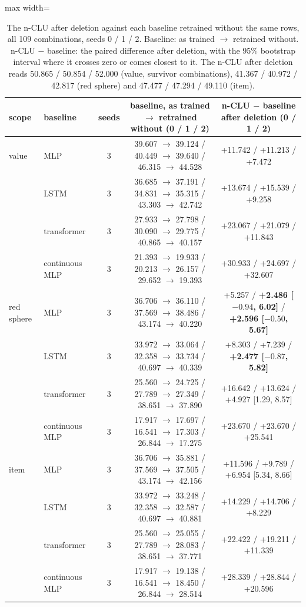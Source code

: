 \documentclass{article} %
\begin{document}
\begin{table}[h]
\centering\scriptsize
\caption{The n-CLU after deletion against each baseline retrained without the same rows, all %
109 combinations, seeds 0 / 1 / 2. Baseline: as trained $\to$ retrained without. n-CLU $-$ baseline: the %
paired difference after deletion, with the 95\% bootstrap interval where it crosses zero or comes
closest to it. The n-CLU after deletion reads 50.865 / 50.854 / 52.000 (value, survivor combinations), %
41.367 / 40.972 / 42.817 (red sphere) and 47.477 / 47.294 / 49.110 (item).}
\label{tab:rivals-del-seeds}
\setlength{\tabcolsep}{2.4pt}
\begin{adjustbox}{max width=\linewidth}\begin{tabular}{llccc}
\toprule
scope & baseline & seeds & baseline, as trained $\to$ retrained without (0 / 1 / 2) & n-CLU $-$ baseline after deletion (0 / 1 / 2) \\
\midrule
value & MLP & 3 & 39.607 $\to$ 39.124 / 40.449 $\to$ 39.640 / 46.315 $\to$ 44.528 & +11.742 / +11.213 / +7.472 \\
 & LSTM & 3 & 36.685 $\to$ 37.191 / 34.831 $\to$ 35.315 / 43.303 $\to$ 42.742 & +13.674 / +15.539 / +9.258 \\
 & transformer & 3 & 27.933 $\to$ 27.798 / 30.090 $\to$ 29.775 / 40.865 $\to$ 40.157 & +23.067 / +21.079 / +11.843 \\
 & continuous MLP & 3 & 21.393 $\to$ 19.933 / 20.213 $\to$ 26.157 / 29.652 $\to$ 19.393 & +30.933 / +24.697 / +32.607 \\
red sphere & MLP & 3 & 36.706 $\to$ 36.110 / 37.569 $\to$ 38.486 / 43.174 $\to$ 40.220 & +5.257 / \textbf{+2.486 [$-0.94$, 6.02]} / \textbf{+2.596 [$-0.50$, 5.67]} \\
 & LSTM & 3 & 33.972 $\to$ 33.064 / 32.358 $\to$ 33.734 / 40.697 $\to$ 40.339 & +8.303 / +7.239 / \textbf{+2.477 [$-0.87$, 5.82]} \\
 & transformer & 3 & 25.560 $\to$ 24.725 / 27.789 $\to$ 27.349 / 38.651 $\to$ 37.890 & +16.642 / +13.624 / +4.927 [1.29, 8.57] \\
 & continuous MLP & 3 & 17.917 $\to$ 17.697 / 16.541 $\to$ 17.303 / 26.844 $\to$ 17.275 & +23.670 / +23.670 / +25.541 \\
item & MLP & 3 & 36.706 $\to$ 35.881 / 37.569 $\to$ 37.505 / 43.174 $\to$ 42.156 & +11.596 / +9.789 / +6.954 [5.34, 8.66] \\
 & LSTM & 3 & 33.972 $\to$ 33.248 / 32.358 $\to$ 32.587 / 40.697 $\to$ 40.881 & +14.229 / +14.706 / +8.229 \\
 & transformer & 3 & 25.560 $\to$ 25.055 / 27.789 $\to$ 28.083 / 38.651 $\to$ 37.771 & +22.422 / +19.211 / +11.339 \\
 & continuous MLP & 3 & 17.917 $\to$ 19.138 / 16.541 $\to$ 18.450 / 26.844 $\to$ 28.514 & +28.339 / +28.844 / +20.596 \\
\bottomrule
\end{tabular}\end{adjustbox}
\end{table}
\end{document}
